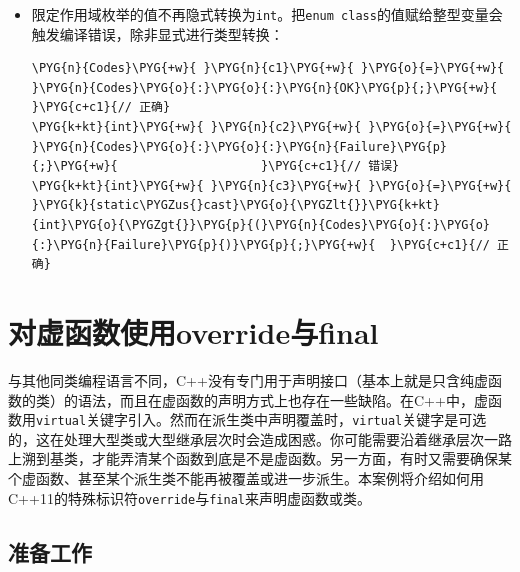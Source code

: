 \begin{itemize}

\item 限定作用域枚举的值不再隐式转换为\texttt{int}。把\texttt{enum class}的值赋给整型变量会触发编译错误，除非显式进行类型转换：



\begin{codeblockbg}
\begin{Verbatim}[commandchars=\\\{\},breaklines=true,breakanywhere=true,fontsize=\codefont,xleftmargin=17bp]
\PYG{n}{Codes}\PYG{+w}{ }\PYG{n}{c1}\PYG{+w}{ }\PYG{o}{=}\PYG{+w}{ }\PYG{n}{Codes}\PYG{o}{:}\PYG{o}{:}\PYG{n}{OK}\PYG{p}{;}\PYG{+w}{                       }\PYG{c+c1}{// 正确}
\PYG{k+kt}{int}\PYG{+w}{ }\PYG{n}{c2}\PYG{+w}{ }\PYG{o}{=}\PYG{+w}{ }\PYG{n}{Codes}\PYG{o}{:}\PYG{o}{:}\PYG{n}{Failure}\PYG{p}{;}\PYG{+w}{                    }\PYG{c+c1}{// 错误}
\PYG{k+kt}{int}\PYG{+w}{ }\PYG{n}{c3}\PYG{+w}{ }\PYG{o}{=}\PYG{+w}{ }\PYG{k}{static\PYGZus{}cast}\PYG{o}{\PYGZlt{}}\PYG{k+kt}{int}\PYG{o}{\PYGZgt{}}\PYG{p}{(}\PYG{n}{Codes}\PYG{o}{:}\PYG{o}{:}\PYG{n}{Failure}\PYG{p}{)}\PYG{p}{;}\PYG{+w}{  }\PYG{c+c1}{// 正确}
\end{Verbatim}
\end{codeblockbg}

\end{itemize}



\section{对虚函数使用override与final}



与其他同类编程语言不同，C++没有专门用于声明接口（基本上就是只含纯虚函数的类）的语法，而且在虚函数的声明方式上也存在一些缺陷。在C++中，虚函数用\texttt{virtual}关键字引入。然而在派生类中声明覆盖时，\texttt{virtual}关键字是可选的，这在处理大型类或大型继承层次时会造成困惑。你可能需要沿着继承层次一路上溯到基类，才能弄清某个函数到底是不是虚函数。另一方面，有时又需要确保某个虚函数、甚至某个派生类不能再被覆盖或进一步派生。本案例将介绍如何用C++11的特殊标识符\texttt{override}与\texttt{final}来声明虚函数或类。



\subsection{准备工作}


